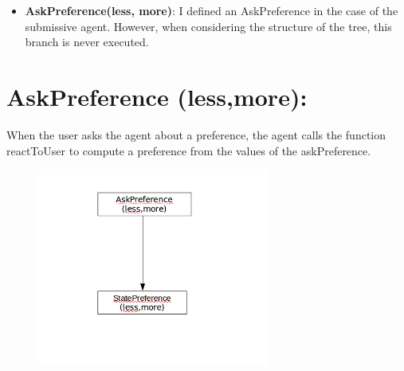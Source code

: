 \documentclass{llncs}
\begin{document}
\begin{itemize}
\begin{figure}[h]
\begin{algorithmic}[1]
					\end{algorithmic}
					\vskip 8pt
				\end{figure}
		
		\item \textbf{AskPreference(less, more)}: I defined an AskPreference in the case of the submissive agent. However, when considering the structure of the tree, this branch is never executed. 

		
		
\end{itemize}
%

\section{AskPreference (less,more): } 
		When the user asks the agent about a preference, the agent calls the function reactToUser to compute a preference from the values of the askPreference.
		\begin{figure}[]
				\centerline{\includegraphics[width=3in]{figs/utterances_v2/askPref.png}}
				\vskip 8pt
		\end{figure}
\end{document}
